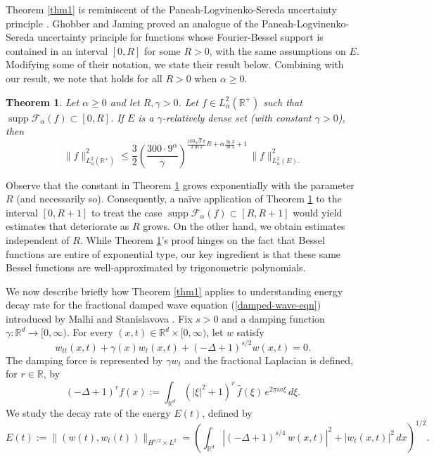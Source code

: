 \documentclass[11pt,a4paper,reqno,dvipsnames]{amsart}
\newcommand{\F}{\mathcal{F}}
\newcommand{\R}{\mathbb R}
\renewcommand{\ge}{\geqslant}
\renewcommand{\le}{\leqslant}
\numberwithin{equation}{section}
\theoremstyle{plain}
\newtheorem{theorem}[equation]{Theorem}
\theoremstyle{definition}
\theoremstyle{remark}
\begin{document}
Theorem \ref{thm1} is reminiscent of the Paneah-Logvinenko-Sereda uncertainty principle \cite{havin12, muscschlag,logvinenko74,paneah61}.  Ghobber and Jaming \cite{gj} proved an analogue of the Paneah-Logvinenko-Sereda uncertainty principle for functions whose Fourier-Bessel support is contained in an interval $[0,R]$ for some $R > 0$, with the same assumptions on $E$. Modifying some of their notation, we state their result below. Combining  with our result, we note that  holds for all $R >0$ when $\alpha \ge 0$. 

\begin{theorem}
\label{thm-gj}
    Let $\alpha \ge 0$ and let $R, \gamma > 0$. Let $f\in L^2_\alpha(\R^+)$ such that $\operatorname{supp} \F_\alpha (f) \subset [0,R]$. If $E$ is a $\gamma$-relatively dense set (with constant $\gamma>0$), then 
    $$\|f\|^2_{L^2_\alpha(\R^+)} \le \frac{3}{2} \left(\frac{300 \cdot 9^\alpha}{\gamma} \right)^{\frac{160\sqrt{3} \pi}{2\ln 2} R + \alpha \frac{\ln 3}{\ln 2} + 1}\, \|f\|^2_{L^2_\alpha(E).}$$
\end{theorem}

Observe that the constant in Theorem \ref{thm-gj} grows exponentially with the parameter $R$ (and necessarily so). Consequently, a naïve application of Theorem \ref{thm-gj} to the interval $[0,R+1]$ to treat the case $\operatorname{supp} \F_\alpha (f) \subset [R,R+1]$ would yield estimates that deteriorate as $R$ grows. On the other hand, we obtain estimates independent of $R$. While Theorem \ref{thm-gj}'s proof hinges on the fact that Bessel functions are entire of exponential type, our key ingredient is that these same Bessel functions are well-approximated by trigonometric polynomials. 


We now describe briefly how Theorem \ref{thm1} applies to understanding energy decay rate for the fractional damped wave equation (\ref{damped-wave-eqn}) introduced by Malhi and Stanislavova \cite{malhi2020energy}. Fix $s > 0$ and a damping function $\gamma: \R^d \to [0, \infty)$. For every $(x,t) \in \R^d \times [0, \infty)$, let $w$ satisfy
\begin{equation}
    \label{damped-wave-eqn}
    w_{tt}(x,t) + \gamma(x) w_t(x,t) + (-\Delta + 1)^{s/2} w(x,t) = 0.
\end{equation}
      The damping force is represented by $\gamma w_t$ and the fractional Laplacian is defined, for $r \in \R$, by 
      $$(-\Delta + 1)^r f(x) := \int_{\R^d} (|\xi|^2 + 1)^r\, \widehat{f}(\xi)\, e^{2\pi ix\xi}\, d\xi.$$
      We study the decay rate of the energy $E(t)$, defined by
      $$E(t) := \|(w(t), w_t(t))\|_{H^{s/2} \times L^2} = \left(\int_{\R^d} |(-\Delta + 1)^{s/4}\, w(x,t)|^2 + |w_t(x,t)|^2 \,dx \right)^{1/2}.$$
\end{document}

